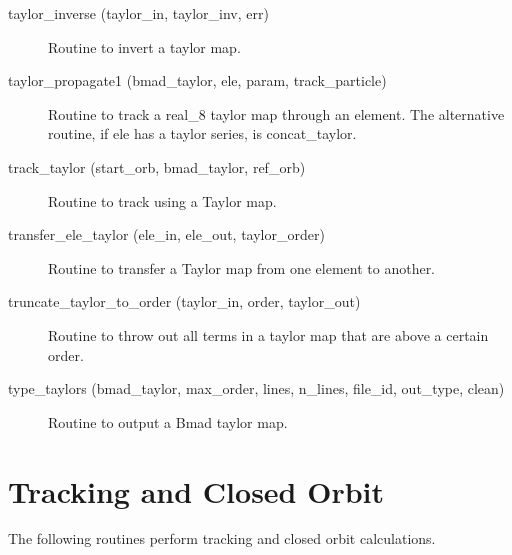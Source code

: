 \begin{description}
\label{r:taylor.inverse}
\item[taylor_inverse (taylor_in, taylor_inv, err)] \Newline
Routine to invert a taylor map. 

\label{r:taylor.propagate1}
\item[taylor_propagate1 (bmad_taylor, ele, param, track_particle)] \Newline
Routine to track a real_8 taylor map through an element. 
The alternative routine, if ele has a taylor series, is concat_taylor. 

\label{r:track.taylor}
\item[track_taylor (start_orb, bmad_taylor, ref_orb)] \Newline
Routine to track using a Taylor map. 

\label{r:transfer.ele.taylor}
\item[transfer_ele_taylor (ele_in, ele_out, taylor_order)] \Newline 
Routine to transfer a Taylor map from one element to another.

\label{r:truncate.taylor.to.order}
\item[truncate_taylor_to_order (taylor_in, order, taylor_out)] \Newline 
Routine to throw out all terms in a taylor map that are above a certain order.

\label{r:type.taylors}
\item[type_taylors (bmad_taylor, max_order, lines, n_lines, file_id, out_type, clean)] \Newline
Routine to output a Bmad taylor map.

\end{description}

\section{Tracking and Closed Orbit}
\label{r:track}    

The following routines perform tracking and closed orbit calculations.

